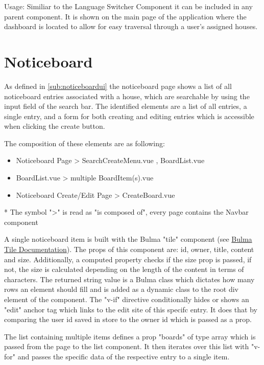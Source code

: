 Usage: Similiar to the Language Switcher Component it can be included in any parent component. It is shown on the main page of the application where the dashboard is located to allow for easy traversal through a user's assigned houses.

\section{Noticeboard}
As defined in \autoref{sub:noticeboardui} the noticeboard page shows a list of all noticeboard entries associated with a house, which are searchable by using the input field of the search bar. The identified elements are a list of all entries, a single entry, and a form for both creating and editing entries which is accessible when clicking the create button.

The composition of these elements are as following:

\begin{itemize}
  \item Noticeboard Page > SearchCreateMenu.vue , BoardList.vue
  \item BoardList.vue > multiple BoardItem(s).vue
  \item Noticeboard Create/Edit Page > CreateBoard.vue
\end{itemize}

* The symbol ">" is read as "is composed of", every page contains the Navbar component

A single noticeboard item is built with the Bulma "tile" component (see \href{https://bulma.io/documentation/layout/tiles/}{Bulma Tile Documentation}). The props of this component are: id, owner, title, content and size. Additionally, a computed property checks if the size prop is passed, if not, the size is calculated depending on the length of the content in terms of characters. The returned string value is a Bulma class which dictates how many rows an element should fill and is added as a dynamic class to the root div element of the component. The "v-if" directive conditionally hides or shows an "edit" anchor tag which links to the edit site of this specifc entry. It does that by comparing the user id saved in store to the owner id which is passed as a prop.

The list containing multiple items defines a prop "boards" of type array which is passed from the page to the list component. It then iterates over this list with "v-for" and passes the specific data of the respective entry to a single item.

